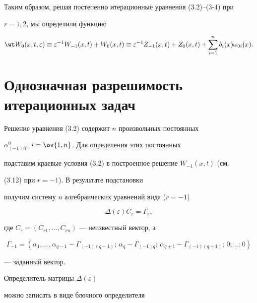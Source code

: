  


Таким образом, решая постепенно итерационные уравнения (3.2)--(3-4) при 


$r=1,2$, мы определили функцию 


$$ 


\wt W_0(x,t,\varepsilon)\equiv\varepsilon^{-1} 


W_{-1}(x,t)+W_0(x,t)\equiv\varepsilon^{-1}Z_{-1}(x,t)+ 


Z_0(x,t)+\sum^n_{i=1}b_i(x)\omega_{0i}(x). 


$$ 


 


\section{Однозначная разрешимость итерационных задач} 


 


Решение уравнения (3.2) содержит $n$ произвольных постоянных 


$\alpha^0_{(-1)ii}$, $i=\ov{1,n}$. Для определения этих постоянных 


подставим краевые условия (3.2) в построенное решение $W_{-1}(x,t)$ (см. 


(3.12) при $r=-1$). В результате подстановки 


получим систему $n$ алгебраических уравнений вида ($r=-1$) 


\begin{equation} 


\Delta(\varepsilon)C_r=\Gamma_r, 


\end{equation} 


где $C_r=(C_{r1},\dotsc,C_{rn})$ --- неизвестный вектор, а 


$$ 


\Gamma_{-1}=(\alpha_1,\dotsc,\alpha_{q-1}-\Gamma_{(-1)(q-1)};\, 


\alpha_q-\Gamma_{(-1)q};\,\alpha_{q+1}-\Gamma_{(-1)(q+1)};\, 


0;\dotsc;0) 


$$ 


--- заданный вектор. 


 


Определитель матрицы $\Delta(\varepsilon)$ 


можно записать в виде блочного определителя 


$$ 


